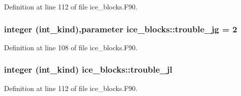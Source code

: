 Definition at line 112 of file ice\_\-blocks.F90.\hypertarget{namespaceice__blocks_a508d64694caacafbc0b551ebd1340c4a}{
\subsubsection[{trouble\_\-jg}]{\setlength{\rightskip}{0pt plus 5cm}integer (int\_\-kind),parameter {\bf ice\_\-blocks::trouble\_\-jg} = 2}}
\label{namespaceice__blocks_a508d64694caacafbc0b551ebd1340c4a}


Definition at line 108 of file ice\_\-blocks.F90.\hypertarget{namespaceice__blocks_a50ca28a3bb76af2138eaf1bcedbd277f}{
\subsubsection[{trouble\_\-jl}]{\setlength{\rightskip}{0pt plus 5cm}integer (int\_\-kind) {\bf ice\_\-blocks::trouble\_\-jl}}}
\label{namespaceice__blocks_a50ca28a3bb76af2138eaf1bcedbd277f}


Definition at line 112 of file ice\_\-blocks.F90.